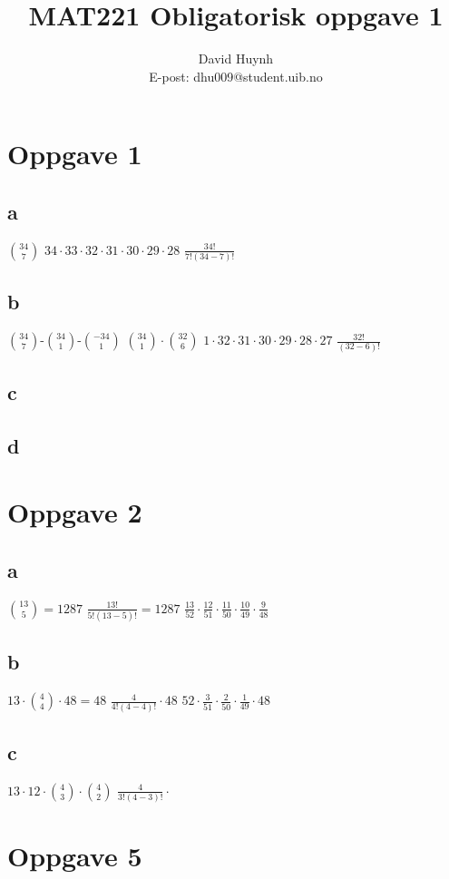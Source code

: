 \documentclass{article}
\begin{document}
\title{MAT221 Obligatorisk oppgave 1}
\author{David Huynh\\E-post: dhu009@student.uib.no}
\maketitle

\section*{Oppgave 1}

\subsection*{a}

$34 \choose 7$
$34 \cdotp 33 \cdotp 32 \cdotp 31 \cdotp 30 \cdotp 29 \cdotp 28$
$\frac{34!}{7!(34-7)!}$

\subsection*{b}

$34 \choose 7$-$34 \choose 1$-$- 34 \choose 1$
${34 \choose 1} \cdotp {32 \choose 6}$
$1 \cdotp 32 \cdotp 31 \cdotp 30 \cdotp 29 \cdotp 28 \cdotp 27$
$\frac{32!}{(32-6)!}$

\subsection*{c}

\subsection*{d}

\section*{Oppgave 2}

\subsection*{a}
${13 \choose 5}=1287$
$\frac{13!}{5!(13-5)!} = 1287$
$\frac{13}{52} \cdotp \frac{12}{51} \cdotp \frac{11}{50} \cdotp \frac{10}{49} \cdotp \frac{9}{48}$

\subsection*{b}
$13 \cdotp {4 \choose 4} \cdotp 48=48$
$\frac{4}{4!(4-4)!} \cdotp 48$
$52 \cdotp \frac{3}{51} \cdotp \frac{2}{50} \cdotp \frac{1}{49} \cdotp 48$

 \subsection*{c} 
 $13 \cdotp 12 \cdotp {4 \choose 3} \cdotp {4 \choose 2}$
 $\frac{4}{3!(4-3)!} \cdotp $
 
 \section*{Oppgave 5}
\end{document}
